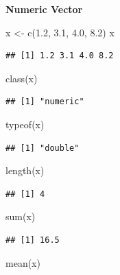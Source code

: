 \documentclass[
]{book}
\newenvironment{Shaded}{\begin{snugshade}}{\end{snugshade}}
\newcommand{\FloatTok}[1]{\textcolor[rgb]{0.00,0.00,0.81}{#1}}
\newcommand{\FunctionTok}[1]{\textcolor[rgb]{0.00,0.00,0.00}{#1}}
\newcommand{\NormalTok}[1]{#1}
\newcommand{\OtherTok}[1]{\textcolor[rgb]{0.56,0.35,0.01}{#1}}
\begin{document}
\textbf{Numeric Vector}

\begin{Shaded}
\begin{Highlighting}[]
\NormalTok{x }\OtherTok{\textless{}{-}} \FunctionTok{c}\NormalTok{(}\FloatTok{1.2}\NormalTok{, }\FloatTok{3.1}\NormalTok{, }\FloatTok{4.0}\NormalTok{, }\FloatTok{8.2}\NormalTok{)}
\NormalTok{x}
\end{Highlighting}
\end{Shaded}

\begin{verbatim}
## [1] 1.2 3.1 4.0 8.2
\end{verbatim}

\begin{Shaded}
\begin{Highlighting}[]
\FunctionTok{class}\NormalTok{(x)}
\end{Highlighting}
\end{Shaded}

\begin{verbatim}
## [1] "numeric"
\end{verbatim}

\begin{Shaded}
\begin{Highlighting}[]
\FunctionTok{typeof}\NormalTok{(x)}
\end{Highlighting}
\end{Shaded}

\begin{verbatim}
## [1] "double"
\end{verbatim}

\begin{Shaded}
\begin{Highlighting}[]
\FunctionTok{length}\NormalTok{(x)}
\end{Highlighting}
\end{Shaded}

\begin{verbatim}
## [1] 4
\end{verbatim}

\begin{Shaded}
\begin{Highlighting}[]
\FunctionTok{sum}\NormalTok{(x)}
\end{Highlighting}
\end{Shaded}

\begin{verbatim}
## [1] 16.5
\end{verbatim}

\begin{Shaded}
\begin{Highlighting}[]
\FunctionTok{mean}\NormalTok{(x)}
\end{Highlighting}
\end{Shaded}
\end{document}
